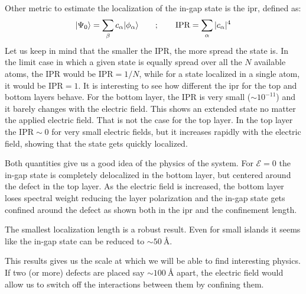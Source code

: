 Other metric to estimate the localization of the in-gap state is the \acf{ipr}, defined as:
\begin{equation}
  |\Psi_0\rangle = \sum_\beta c_\alpha|\phi_\alpha\rangle\quad\quad;\quad\quad
  \text{IPR} = \sum_\alpha |c_\alpha|^4
\end{equation}
Let us keep in mind that the smaller the IPR, the more spread the state is. In the limit case in which a given state is equally spread over all the $N$ available atoms, the IPR would be $\text{IPR}=1/N$, while for a state localized in a single atom, it would be $\text{IPR}=1$.
It is interesting to see how different the \ac{ipr} for the top and bottom layers behave.
For the bottom layer, the IPR is very small ($\sim10^{-11}$) and it barely changes with the electric field. This shows an extended state no matter the applied electric field.
That is not the case for the top layer. In the top layer the $\text{IPR}\sim0$ for very small electric fields, but it increases rapidly with the electric field, showing that the state gets quickly localized.
\medskip

Both quantities give us a good idea of the physics of the system. For $\mathcal{E}=0$ the in-gap state is completely delocalized in the bottom layer, but centered around the defect in the top layer.
As the electric field is increased, the bottom layer loses spectral weight reducing the layer polarization and the in-gap state gets confined around the defect as shown both in the \ac{ipr} and the confinement length.
\smallskip

The smallest localization length is a robust result. Even for small islands it seems like the in-gap state can be reduced to $\sim\SI{50}{\angstrom}$.
\smallskip

This results gives us the scale at which we will be able to find interesting physics. If two (or more) defects are placed say $\sim\SI{100}{\angstrom}$ apart, the electric field would allow us to switch off the interactions between them by confining them.





